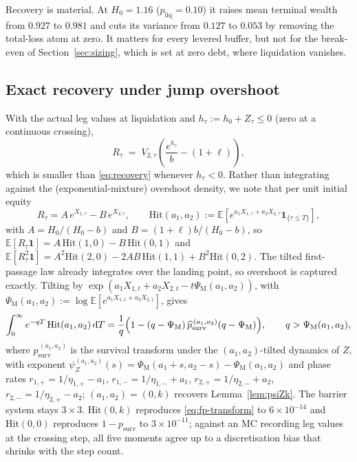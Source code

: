 \documentclass[11pt]{article}
\newcommand{\E}{\mathbb{E}}
\newcommand{\diff}{\mathrm{d}}
\newcommand{\one}{\mathbf{1}}
\theoremstyle{plain}
\theoremstyle{definition}
\theoremstyle{remark}
\begin{document}
Recovery is material. At $H_0=1.16$ ($p_{\mathrm{liq}}=0.10$) it raises mean terminal wealth from
$0.927$ to $0.981$ and cuts its variance from $0.127$ to $0.053$ by removing the total-loss atom at
zero. It matters for every levered buffer, but not for the break-even of
Section~\ref{sec:sizing}, which is set at zero debt, where liquidation vanishes.

\subsection{Exact recovery under jump overshoot}\label{sec:overshoot}
With the actual leg values at liquidation and $h_\tau:=h_0+Z_\tau\le0$ (zero at a continuous
crossing),
\begin{equation}\label{eq:recovery-exact}
R_\tau \;=\; V_{2,\tau}\!\left(\frac{e^{h_\tau}}{b}-(1+\ell)\right),
\end{equation}
which is smaller than \eqref{eq:recovery} whenever $h_\tau<0$. Rather than integrating against the
(exponential-mixture) overshoot density, we note that per unit initial equity
\begin{equation}\label{eq:joint-hit}
R_\tau=A\,e^{X_{1,\tau}}-B\,e^{X_{2,\tau}},
\qquad
\mathrm{Hit}(a_1,a_2):=\E\!\left[e^{a_1X_{1,\tau}+a_2X_{2,\tau}}\one_{\{\tau\le T\}}\right],
\end{equation}
with $A=H_0/(H_0-b)$ and $B=(1+\ell)b/(H_0-b)$, so $\E[R_\tau\one]=A\,\mathrm{Hit}(1,0)-B\,\mathrm{Hit}(0,1)$
and $\E[R_\tau^2\one]=A^2\mathrm{Hit}(2,0)-2AB\,\mathrm{Hit}(1,1)+B^2\mathrm{Hit}(0,2)$. The tilted
first-passage law already integrates over the landing point, so overshoot is captured exactly.
Tilting by $\exp(a_1X_{1,t}+a_2X_{2,t}-t\Psi_{\mathrm{M}}(a_1,a_2))$, with
$\Psi_{\mathrm{M}}(a_1,a_2):=\log\E[e^{a_1X_{1,1}+a_2X_{2,1}}]$, gives
\begin{equation}\label{eq:joint-hit-transform}
\int_0^\infty e^{-qT}\,\mathrm{Hit}(a_1,a_2)\,\diff T
=\frac1q\Bigl(1-(q-\Psi_{\mathrm{M}})\,\widehat p^{\,(a_1,a_2)}_{\mathrm{surv}}(q-\Psi_{\mathrm{M}})\Bigr),
\qquad q>\Psi_{\mathrm{M}}(a_1,a_2),
\end{equation}
where $\widehat p^{\,(a_1,a_2)}_{\mathrm{surv}}$ is the survival transform under the
$(a_1,a_2)$-tilted dynamics of $Z$, with exponent
$\psi_Z^{(a_1,a_2)}(s)=\Psi_{\mathrm{M}}(a_1+s,a_2-s)-\Psi_{\mathrm{M}}(a_1,a_2)$ and phase rates
$r_{1,+}=1/\eta_{1,+}-a_1$, $r_{1,-}=1/\eta_{1,-}+a_1$, $r_{2,+}=1/\eta_{2,-}+a_2$,
$r_{2,-}=1/\eta_{2,+}-a_2$; $(a_1,a_2)=(0,k)$ recovers Lemma~\ref{lem:psiZk}. The barrier system
stays $3\times3$. $\mathrm{Hit}(0,k)$ reproduces \eqref{eq:fp-transform} to $6\times10^{-14}$ and
$\mathrm{Hit}(0,0)$ reproduces $1-p_{\mathrm{surv}}$ to $3\times10^{-11}$; against an MC recording
leg values at the crossing step, all five moments agree up to a discretisation bias that shrinks with
the step count.
\end{document}
